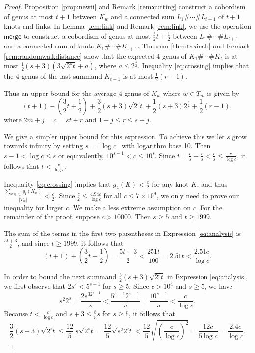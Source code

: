 \documentclass[12pt]{amsart}
\theoremstyle{definition}
\theoremstyle{remark}
\numberwithin{equation}{section}
\newcommand{\merge}{\textsf{merge}}
\begin{document}
\begin{proof} Proposition \ref{prop:newii} and Remark \ref{rem:cutting} construct a cobordism of genus at most $t+1$ between $K_w$ and a connected sum $L_1\#\cdots \# L_{t+1}$ of $t+1$ knots and links. In Lemma \ref{lem:link} and Remark \ref{rem:link}, we use the operation $\merge$ to construct a cobordism of genus at most $\frac{3}{2}t+\frac{1}{2}$ between $L_1\#\cdots \# L_{t+1}$ and a connected sum of knots $K_1\#\cdots \#K_{t+1}$. Theorem \ref{thm:taxicab} and Remark \ref{rem:randomwalkdistance} show that the expected $4$-genus of $K_1\#\cdots \#K_{t}$ is at most $\frac{1}{2}(s+3)(3\sqrt{2^s t}+a)$, where $a\leq 2^{\frac{s}{2}}$. Inequality \ref{eq:crossing} implies that the $4$-genus of the last summand $K_{t+1}$ is at most $\frac{1}{2}(r-1)$.

Thus an upper bound for the average 4-genus of $K_w$ where $w\in T_m$ is given by
\begin{equation}
\label{eq:analysis}
(t+1) +\left(\frac{3}{2}t +\frac{1}{2}\right)+\frac{3}{2}{(s+3)}\sqrt{2^st}+\frac{1}{2}{(s+3)}2^{\frac{s}{2}}+\frac{1}{2}{(r-1)},
\end{equation}
where $2m+j=c=st+r$ and $1+j\leq r\leq s+j$.

We give a simpler upper bound for this expression.  To achieve this we let $s$ grow towards infinity by setting $s=\lceil \log c \rceil$ with logarithm base 10.  Then $s-1 < \log c \leq s$ or equivalently, $10^{s-1}< c \leq 10^{s}$. Since $t=\frac{c}{s}-\frac{r}{s}<\frac{c}{s}\leq\frac{c}{\log c}$, it follows that $t<\frac{c}{\log c}$. 

Inequality \ref{eq:crossing} implies that $g_4(K) < \frac{c}{2}$ for any knot $K$, and thus $\frac{\sum_{w\in T_m} g_4(K_w)}{|T_m|} < \frac{c}{2}$. Since $\frac{c}{2}\leq \frac{4.94c}{\log c}$ for all $c\leq 7\times 10^{9}$, we only need to prove our inequality for larger $c$. We make a less extreme assumption on $c$. For the remainder of the proof, suppose $c> 10000$. Then $s\geq 5$ and $t\geq 1999.$


The sum of the terms in the first two parentheses in Expression \eqref{eq:analysis} is  $\frac{5t+3}{2}$, and since $t\geq 1999$, it follows that 
\begin{equation}
\label{eq:CS_LL}
    (t+1)+\left(\frac{3}{2}t+\frac{1}{2}\right)=\frac{5t+3}{2} < \frac{251t}{100} = 2.51 t < \frac{2.51 c}{\log c}.
\end{equation}  %

In order to bound the next summand $\frac{3}{2}{(s+3)}\sqrt{2^st}$ in Expression \eqref{eq:analysis}, we first observe that  $2s^3<5^{s-1}$ for ${s}\geq 5$.  Since $c>10^4$ and $s\geq 5$, we have
\[
 s^2 2^{s} = \frac{2s^32^{s-1}}{s} < \frac{5^{s-1}2^{s-1}}{s} = \frac{10^{s-1}}{s}<\frac{c}{\log c}.
\]
Because $t< \frac{c}{\log c}$ and $s+3\leq \frac{8}{5}s$ for $s\geq 5$, it follows that
\begin{equation}
\label{eq:end}
\frac{3}{2}(s+3)\sqrt{2^s t} \leq \frac{12}{5}\;s\sqrt{2^s t}=\frac{12}{5}\sqrt{s^2 2^s t}<\frac{12}{5}\sqrt{\left(\frac{c}{\log c}\right)^2}=\frac{12 c}{5\log c} =\frac{2.4 c}{\log c}.
\end{equation}


\end{proof}
\end{document}
